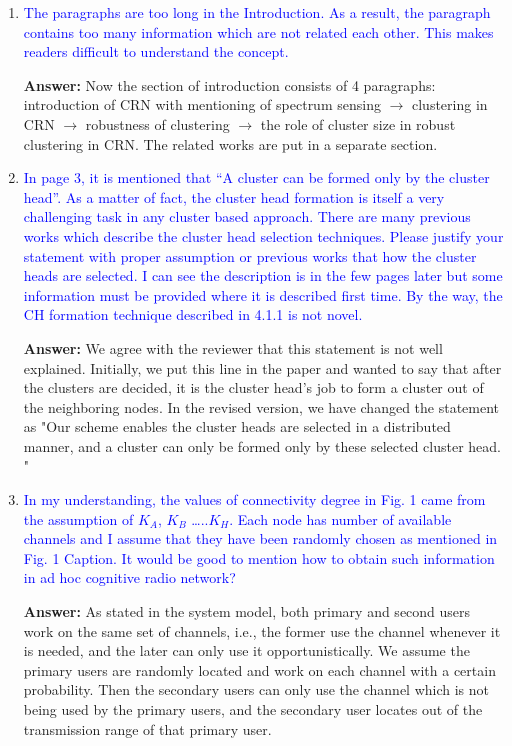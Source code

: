 \documentclass[10pt,a4paper]{article}
\begin{document}
\begin{enumerate}
\item \textcolor{blue}{  The paragraphs are too long in the Introduction. As a result, the paragraph contains too many information which are not related each other. This makes readers difficult to understand the concept.}
    
    \textbf{Answer:} Now the section of introduction consists of 4 paragraphs: introduction of CRN with mentioning of spectrum sensing $\rightarrow$ clustering in CRN $\rightarrow$ robustness of clustering $\rightarrow$ the role of cluster size in robust clustering in CRN.
    The related works are put in a separate section.
    
\item \textcolor{blue}{   In page 3, it is mentioned that “A cluster can be formed only by the cluster head”. As a matter of fact, the cluster head formation is itself a very challenging task in any cluster based approach. There are many previous works which describe the cluster head selection techniques. Please justify your statement with proper assumption or previous works that how the cluster heads are selected. I can see the description is in the few pages later but some information must be provided where it is described first time. By the way, the CH formation technique described in 4.1.1 is not novel.}

\textbf{Answer:} We agree with the reviewer that this statement is not well explained.
	    Initially, we put this line in the paper and wanted to say that after the clusters are decided, it is the cluster head's job to form a cluster out of the neighboring nodes.
In the revised version, we have changed the statement as "Our scheme enables the cluster heads are selected in a distributed manner, and a cluster can only be formed only by these selected cluster head. "
    
\item \textcolor{blue}{  In my understanding, the values of connectivity degree in Fig. 1 came from the assumption of $K_A$, $K_B$ …..$K_H$. Each node has number of available channels and I assume that they have been randomly chosen as mentioned in Fig. 1 Caption. It would be good to mention how to obtain such information in ad hoc cognitive radio network?}

\textbf{Answer:} As stated in the system model, both primary and second users work on the same set of channels, i.e., the former use the channel whenever it is needed, and the later can only use it opportunistically.
    We assume the primary users are randomly located and work on each channel with a certain probability.
    Then the secondary users can only use the channel which is not being used by the primary users, and the secondary user locates out of the transmission range of that primary user.
    

\end{enumerate}
\end{document}
